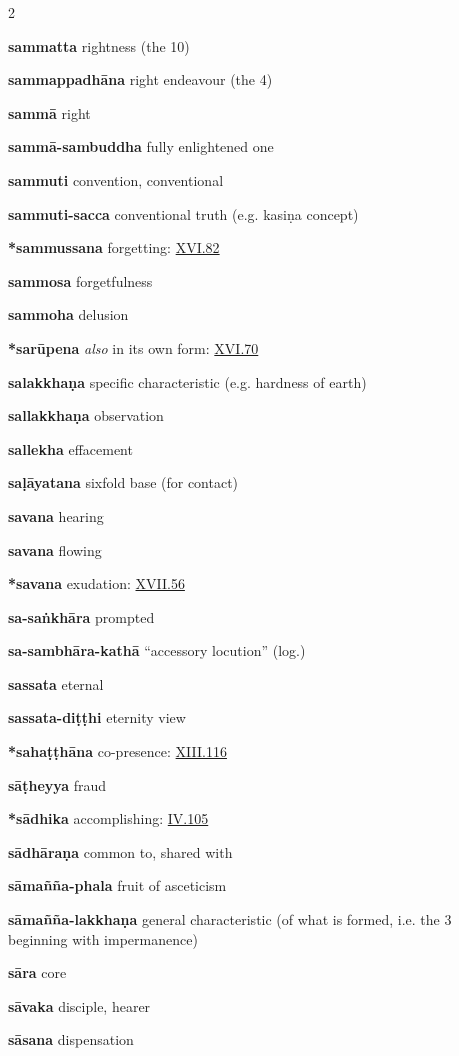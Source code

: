 \begin{multicols}{2}
\begin{vismHanging}
\par\textbf{sammatta} rightness (the 10)
\par\textbf{sammappadhāna} right endeavour (the 4)
\par\textbf{sammā} right
\par\textbf{sammā-sambuddha} fully enlightened one 
\par\textbf{sammuti} convention, conventional 
\par\textbf{sammuti-sacca} conventional truth (e.g. kasiṇa concept) 
\par\textbf{*sammussana} forgetting: \hyperlink{XVI.82}{XVI.82}{}
\par\textbf{sammosa} forgetfulness
\par\textbf{sammoha} delusion 
\par\textbf{*sarūpena} \emph{also }in its own form: \hyperlink{XVI.70}{XVI.70}{} 
\par\textbf{salakkhaṇa} specific characteristic (e.g. hardness of earth) 
\par\textbf{sallakkhaṇa} observation
\par\textbf{sallekha} effacement
\par\textbf{saḷāyatana} sixfold base (for contact)
\par\textbf{savana} hearing
\par\textbf{savana} flowing 
\par\textbf{*savana} exudation: \hyperlink{XVII.56}{XVII.56}{} 
\par\textbf{sa-saṅkhāra} prompted
\par\textbf{sa-sambhāra-kathā} “accessory locution” (log.)
\par\textbf{sassata} eternal
\par\textbf{sassata-diṭṭhi} eternity view
\par\textbf{*sahaṭṭhāna} co-presence: \hyperlink{XIII.116}{XIII.116}{}
\par\textbf{sāṭheyya} fraud
\par\textbf{*sādhika} accomplishing: \hyperlink{IV.105}{IV.105}{}
\par\textbf{sādhāraṇa} common to, shared with
\par\textbf{sāmañña-phala} fruit of asceticism
\par\textbf{sāmañña-lakkhaṇa} general characteristic (of what is formed, i.e. the 3 beginning with impermanence) 
\par\textbf{sāra} core
\par\textbf{sāvaka} disciple, hearer
\par\textbf{sāsana} dispensation

\end{vismHanging}
\end{multicols}
